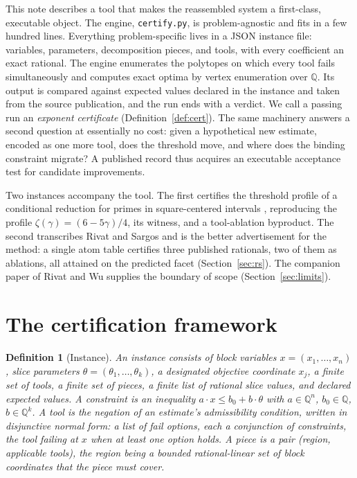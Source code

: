 \documentclass[11pt]{article}
\newtheorem{definition}{Definition}[section]
\newcommand{\Q}{\mathbb{Q}}
\newcommand{\eng}{\texttt{certify.py}}
\begin{document}
This note describes a tool that makes the reassembled system a
first-class, executable object. The engine, \eng, is problem-agnostic
and fits in a few hundred lines. Everything problem-specific lives in a
JSON instance file: variables, parameters, decomposition pieces, and
tools, with every coefficient an exact rational. The engine enumerates
the polytopes on which every tool fails simultaneously and computes
exact optima by vertex enumeration over $\Q$. Its output is compared
against expected values declared in the instance and taken from the
source publication, and the run ends with a verdict. We call a passing
run an \emph{exponent certificate} (Definition~\ref{def:cert}). The
same machinery answers a second question at essentially no cost: given
a hypothetical new estimate, encoded as one more tool, does the
threshold move, and where does the binding constraint migrate? A
published record thus acquires an executable acceptance test for
candidate improvements.

Two instances accompany the tool. The first certifies the threshold
profile of a conditional reduction for primes in square-centered
intervals \cite{ross-reduction,ross-inventory}, reproducing the profile
$\zeta(\gamma)=(6-5\gamma)/4$, its witness, and a tool-ablation
byproduct. The second transcribes Rivat and Sargos
\cite{rivat-sargos} and is the better advertisement for the method: a
single atom table certifies three published rationals, two of them as
ablations, all attained on the predicted facet
(Section~\ref{sec:rs}). The companion paper of Rivat and Wu
\cite{rivat-wu} supplies the boundary of scope
(Section~\ref{sec:limits}).

\section{The certification framework}\label{sec:framework}

\begin{definition}[Instance]\label{def:instance}
An \emph{instance} consists of block variables
$x=(x_1,\dots,x_n)$, slice parameters $\theta=(\theta_1,\dots,\theta_k)$,
a designated objective coordinate $x_j$, a finite set of \emph{tools}, a
finite set of \emph{pieces}, a finite list of rational slice values, and
declared expected values. A \emph{constraint} is an inequality
$a\cdot x\le b_0+b\cdot\theta$ with $a\in\Q^n$, $b_0\in\Q$,
$b\in\Q^k$. A tool is the negation of an estimate's admissibility
condition, written in disjunctive normal form: a list of \emph{fail
options}, each a conjunction of constraints, the tool failing at $x$
when at least one option holds. A piece is a pair (region, applicable
tools), the region being a bounded rational-linear set of block
coordinates that the piece must cover.
\end{definition}
\end{document}
